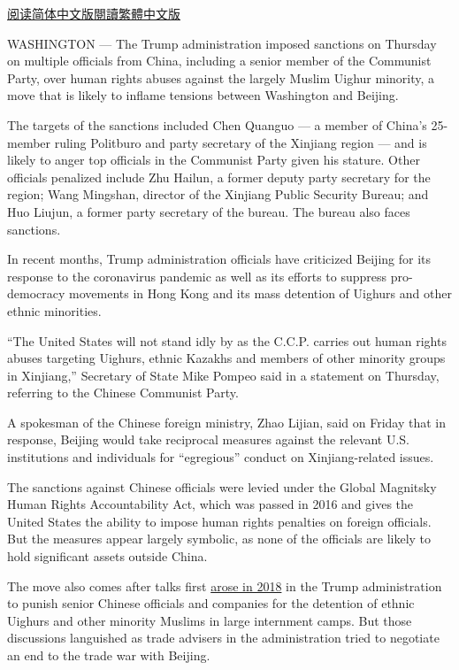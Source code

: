 \href{https://cn.nytimes.com/usa/20200710/trump-china-sanctions-uighurs/}{阅读简体中文版}\href{https://cn.nytimes.com/usa/20200710/trump-china-sanctions-uighurs/zh0-}{閱讀繁體中文版}

WASHINGTON --- The Trump administration imposed sanctions on Thursday on
multiple officials from China, including a senior member of the
Communist Party, over human rights abuses against the largely Muslim
Uighur minority, a move that is likely to inflame tensions between
Washington and Beijing.

The targets of the sanctions included Chen Quanguo --- a member of
China's 25-member ruling Politburo and party secretary of the Xinjiang
region --- and is likely to anger top officials in the Communist Party
given his stature. Other officials penalized include Zhu Hailun, a
former deputy party secretary for the region; Wang Mingshan, director of
the Xinjiang Public Security Bureau; and Huo Liujun, a former party
secretary of the bureau. The bureau also faces sanctions.

In recent months, Trump administration officials have criticized Beijing
for its response to the coronavirus pandemic as well as its efforts to
suppress pro-democracy movements in Hong Kong and its mass detention of
Uighurs and other ethnic minorities.

``The United States will not stand idly by as the C.C.P. carries out
human rights abuses targeting Uighurs, ethnic Kazakhs and members of
other minority groups in Xinjiang,'' Secretary of State Mike Pompeo said
in a statement on Thursday, referring to the Chinese Communist Party.

A spokesman of the Chinese foreign ministry, Zhao Lijian, said on Friday
that in response, Beijing would take reciprocal measures against the
relevant U.S. institutions and individuals for ``egregious'' conduct on
Xinjiang-related issues.

The sanctions against Chinese officials were levied under the Global
Magnitsky Human Rights Accountability Act, which was passed in 2016 and
gives the United States the ability to impose human rights penalties on
foreign officials. But the measures appear largely symbolic, as none of
the officials are likely to hold significant assets outside China.

The move also comes after talks first
\href{https://www.nytimes.com/2018/09/10/world/asia/us-china-sanctions-muslim-camps.html}{arose
in 2018} in the Trump administration to punish senior Chinese officials
and companies for the detention of ethnic Uighurs and other minority
Muslims in large internment camps. But those discussions languished as
trade advisers in the administration tried to negotiate an end to the
trade war with Beijing.


